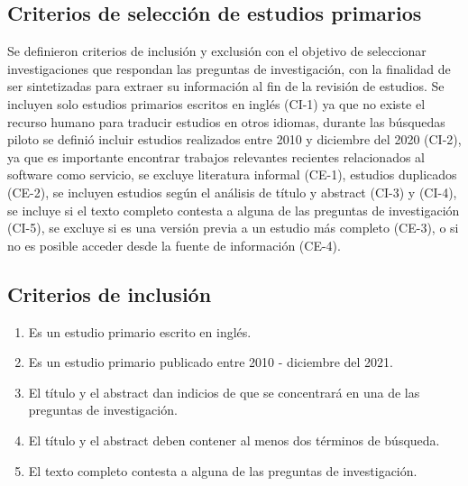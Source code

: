 \documentclass[conference,onecolumn,10pt]{IEEEtran}
\begin{document}
\begin{table}[ht]
        \caption{Términos de búsqueda} 
        \centering 
        \label{table:tablaterminos}
\end{table}

\subsection{Criterios de selección de estudios primarios}
Se definieron criterios de inclusión y exclusión con el objetivo 
de seleccionar investigaciones que respondan las preguntas de investigación, con la finalidad de ser  
sintetizadas para extraer su información al fin de la revisión de estudios.
Se incluyen solo estudios primarios escritos en inglés (CI-1) ya que no existe el
recurso humano para traducir estudios en otros idiomas, durante las búsquedas piloto 
se definió incluir estudios realizados entre 2010  y diciembre del 2020 (CI-2), ya que es importante
encontrar trabajos relevantes recientes relacionados al software como servicio, 
se excluye literatura informal (CE-1), estudios duplicados (CE-2), se incluyen 
estudios según el análisis de título y abstract (CI-3) y (CI-4),
se incluye si el texto completo contesta a alguna de las preguntas de investigación (CI-5), 
se excluye si es una versión previa a un estudio más completo (CE-3), o si no es posible acceder desde la fuente 
de información (CE-4).


\subsection{Criterios de inclusión}
\begin{enumerate}[C-1.-]
  \item{Es un estudio primario escrito en inglés.}
  \item{Es un estudio primario publicado entre 2010 - diciembre del 2021.}
  \item{El título y el abstract dan indicios de que se concentrará en una de las preguntas de investigación.}
  \item{El título y el abstract deben contener al menos dos términos de búsqueda.}
  \item{El texto completo contesta a alguna de las preguntas de investigación.}
\end{enumerate}
\end{document}
